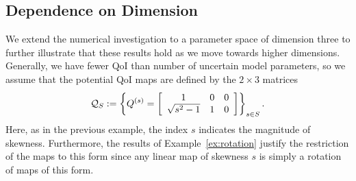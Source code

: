 
\subsection{Dependence on Dimension}\label{ex:3dmap}
We extend the numerical investigation to a parameter space of dimension three to further illustrate that these results hold as we move towards higher dimensions.
Generally, we have fewer QoI than number of uncertain model parameters, so we assume that the potential QoI maps are defined by the $2\times 3$ matrices
\begin{equation}\label{eq:qmap3}
\qspace_S := \left \lbrace Q^{(s)} =  \mat{ccc}{1 & 0 & 0\\ \sqrt{s^2 - 1}& 1 & 0} \right \rbrace_{s\in S}.
\end{equation}
Here, as in the previous example, the index $s$ indicates the magnitude of skewness.
Furthermore, the results of Example~\ref{ex:rotation} justify the restriction of the maps to this form since any linear map of skewness $s$ is simply a rotation of maps of this form.

%
%


